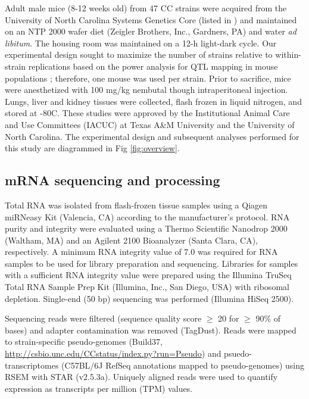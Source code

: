 \documentclass[10pt,letterpaper]{article}
\begin{document}
Adult male mice (8-12 weeks old) from 47 CC strains were acquired from the University of North Carolina Systems Genetics Core (listed in ) and maintained on an NTP 2000 wafer diet (Zeigler Brothers, Inc., Gardners, PA) and water \textit{ad libitum}. The housing room was maintained on a 12-h light-dark cycle. Our experimental design sought to maximize the number of strains relative to within-strain replications based on the power analysis for QTL mapping in mouse populations \cite{Kaeppler1997}; therefore, one mouse was used per strain. Prior to sacrifice, mice were anesthetized with 100 mg/kg nembutal though intraperitoneal injection. Lungs, liver and kidney tissues were collected, flash frozen in liquid nitrogen, and stored at -80\degree C. These studies were approved by the Institutional Animal Care and Use Committees (IACUC) at Texas A\&M University and the University of North Carolina. The experimental design and subsequent analyses performed for this study are diagrammed in Fig \ref{fig:overview}.


\subsection*{mRNA sequencing and processing}

Total RNA was isolated from flash-frozen tissue samples using a Qiagen miRNeasy Kit (Valencia, CA) according to the manufacturer’s protocol. RNA purity and integrity were evaluated using a Thermo Scientific Nanodrop 2000 (Waltham, MA) and an Agilent 2100 Bioanalyzer (Santa Clara, CA), respectively. A minimum RNA integrity value of 7.0 was required for RNA samples to be used for library preparation and sequencing. Libraries for samples with a sufficient RNA integrity value were prepared using the Illumina TruSeq Total RNA Sample Prep Kit (Illumina, Inc., San Diego, USA) with ribosomal depletion. Single-end (50 bp) sequencing was performed (Illumina HiSeq 2500).

Sequencing reads were filtered (sequence quality score $\ge$ 20 for $\ge$ 90\% of bases) and adapter contamination was removed (TagDust). Reads were mapped to strain-specific pseudo-genomes (Build37, \url{http://csbio.unc.edu/CCstatus/index.py?run=Pseudo}) and psuedo-transcriptomes (C57BL/6J RefSeq annotations mapped to pseudo-genomes) using RSEM with STAR (v2.5.3a). Uniquely aligned reads were used to quantify expression as transcripts per million (TPM) values.
\end{document}
